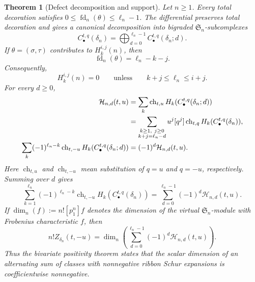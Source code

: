 \documentclass{amsart}
\newtheorem{theorem}{Theorem}[section]
\theoremstyle{definition}
\theoremstyle{remark}
\begin{document}
\begin{theorem}[Defect decomposition and support]
\label{thm:factorization-defect-layers}
Let $n\geq1$.  Every total decoration satisfies
$0\leq\operatorname{fd}_n(\theta)\leq\ell_n-1$.  The differential preserves
total decoration and gives a canonical decomposition into bigraded
$\mathfrak S_n$-subcomplexes
\begin{equation}
 C_\bullet^{t,q}(\delta_n)
 =\bigoplus_{d=0}^{\ell_n-1}C_\bullet^{t,q}(\delta_n;d).
 \label{eq:defect-chain-splitting}
\end{equation}
If $\theta=(\sigma,\tau)$ contributes to $H_k^{i,j}(n)$, then
\begin{equation}
 \operatorname{fd}_n(\theta)=\ell_n-k-j.
 \label{eq:defect-degree-relation}
\end{equation}
Consequently,
\begin{equation}
 H_k^{i,j}(n)=0
 \qquad\text{unless}\qquad
 k+j\leq\ell_n\leq i+j.
 \label{eq:homology-support-wedge}
\end{equation}
For every $d\geq0$,
\begin{align}
 \mathcal H_{n,d}(t,u)
 &=\sum_k\operatorname{ch}_{t,u}
       H_k(C_\bullet^{t,q}(\delta_n;d))
 \notag\\
 &=\sum_{\substack{k\geq1,\ j\geq0\\k+j=\ell_n-d}}
   u^j[q^j]\operatorname{ch}_{t,q}
   H_k(C_\bullet^{t,q}(\delta_n)),
 \label{eq:defect-layer-homology}\\
 \sum_k(-1)^{\ell_n-k}\operatorname{ch}_{t,-u}
       H_k(C_\bullet^{t,q}(\delta_n;d))
 &=(-1)^d\mathcal H_{n,d}(t,u).
 \label{eq:single-defect-euler}
\end{align}
Here $\operatorname{ch}_{t,u}$ and $\operatorname{ch}_{t,-u}$ mean
substitution of $q=u$ and $q=-u$, respectively.  Summing over $d$ gives
\begin{equation}
 \sum_{k=1}^{\ell_n}(-1)^{\ell_n-k}
 \operatorname{ch}_{t,-u}H_k(C_\bullet^{t,q}(\delta_n))
 =\sum_{d=0}^{\ell_n-1}(-1)^d\mathcal H_{n,d}(t,u).
 \label{eq:defect-euler-decomposition}
\end{equation}
If $\dim_n(f):=n![p_1^n]f$ denotes the dimension of the virtual
$\mathfrak S_n$-module with Frobenius characteristic $f$, then
\begin{equation}
 n!Z_{\delta_n}(t,-u)
 =\dim_n\!\left(\sum_{d=0}^{\ell_n-1}
                  (-1)^d\mathcal H_{n,d}(t,u)\right).
 \label{eq:defect-dimension-positivity}
\end{equation}
Thus the bivariate positivity theorem states that the scalar dimension of an
alternating sum of classes with nonnegative ribbon Schur expansions is coefficientwise
nonnegative.
\end{theorem}
\end{document}
